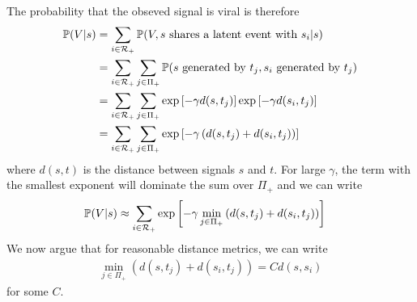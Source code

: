 The probability that the obseved signal is viral is therefore
\begin{align}
\mathbb{P}(V | s) &= \sum_{i \in \mathcal{R}_+}  \mathbb{P}(V , s \text{ shares a latent event with } s_i | s)\notag\\
&= \sum_{i \in \mathcal{R}_+} \sum_{j \in \Pi_+} \mathbb{P}( s \text{ generated by } t_j, s_i \text{ generated by } t_j)\notag\\
&= \sum_{i \in \mathcal{R}_+} \sum_{j \in \Pi_+} \exp{\left[-\gamma d(s,t_j)\right]} \exp{\left[-\gamma d(s_i,t_j)\right]}\notag\\
&= \sum_{i \in \mathcal{R}_+} \sum_{j \in \Pi_+} \exp{\left[-\gamma\left( d(s,t_j) + d(s_i,t_j) \right)\right]}
\end{align}
where $d(s,t)$ is the distance between signals $s$ and $t$. For large $\gamma$, the term with the smallest exponent will dominate the sum over $\Pi_+$ and we can write
\begin{align}
\mathbb{P}(V | s) &\approx \sum_{i \in \mathcal{R}_+} \exp{\left[-\gamma \min_{j \in \Pi_+} \left( d(s,t_j) + d(s_i,t_j) \right) \right]}
\end{align}
We now argue that for reasonable distance metrics, we can write
\begin{gather*}
\min_{j \in \Pi_+} \left( d(s,t_j) + d(s_i,t_j) \right) = Cd(s,s_i)
\end{gather*}
for some $C$.
